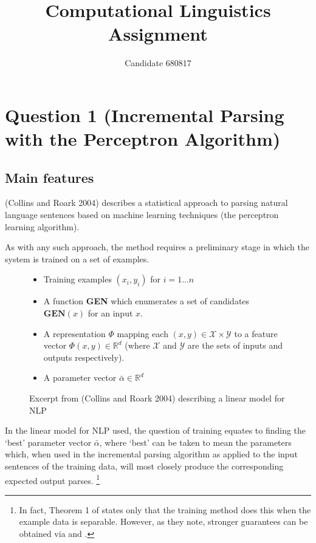 \documentclass[11pt]{article}
\begin{document}
\title{Computational Linguistics Assignment}
\author{Candidate 680817}
\maketitle

\section*{Question 1 (Incremental Parsing with the Perceptron Algorithm)}
\subsection*{Main features}
(Collins and Roark 2004)\cite{Collins2004} describes a statistical approach to parsing
natural language sentences based on machine learning techniques (the perceptron
learning algorithm). 

As with any such approach, the method requires a preliminary stage in which the
system is trained on a set of examples. 

\begin{figure}[h]
   \caption{Excerpt from (Collins and Roark 2004) describing a linear model for NLP}
   \begin{itemize}
   \item{Training examples $(x_i, y_i)$ for $i = 1 \dots n$}
   \item{A function \textbf{GEN} which enumerates a set of candidates $\textbf{GEN}(x)$ for an input $x$.}
   \item{
   A representation $\Phi$ mapping each $(x, y) \in \mathcal{X} \times
   \mathcal{Y}$ to a feature vector $\Phi(x, y) \in \mathbb{R}^d$ (where
   $\mathcal{X}$ and $\mathcal{Y}$ are the sets of inputs and outputs
   respectively).
   }
   \item{A parameter vector $\bar{\alpha} \in \mathbb{R}^d$}
   \end{itemize}
\end{figure}

In the linear model for NLP used, the question of training equates to finding
the `best' parameter vector $\bar{\alpha}$, where `best' can be taken to mean
the parameters which, when used in the incremental parsing algorithm as applied
to the input sentences of the training data, will most closely produce the
corresponding expected output parses.
\footnote{
In fact, Theorem 1 of \cite{Collins2004} states only that the training method does
this when the example data is separable. However, as they note, stronger
guarantees can be obtained via \cite{Freund1999} and \cite{Collins2002}.
}
\end{document}
